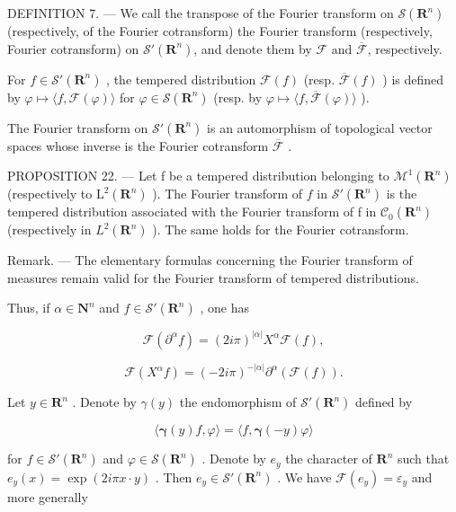 DEFINITION 7. --- We call the transpose of the Fourier transform on \(\mathcal{S}(\mathbf{R}^n)\) (respectively, of the Fourier cotransform) the Fourier transform (respectively, Fourier cotransform) on \(\mathcal{S}'(\mathbf{R}^n)\), and denote them by \(\mathcal{F}\) and \(\overline{\mathcal{F}}\), respectively.

For \(f \in \mathcal{S}'(\mathbf{R}^n)\) , the tempered distribution \(\mathcal{F}(f)\) (resp. \(\overline{\mathcal{F}}(f)\) ) is defined by \(\varphi \mapsto \langle f, \mathcal{F}(\varphi) \rangle\) for \(\varphi \in \mathcal{S}(\mathbf{R}^n)\) (resp. by \(\varphi \mapsto \langle f, \overline{\mathcal{F}}(\varphi) \rangle\) ).

The Fourier transform on \(\mathcal{S}'(\mathbf{R}^n)\) is an automorphism of topological vector spaces whose inverse is the Fourier cotransform \(\overline{\mathcal{F}}\) .

PROPOSITION 22. --- Let f be a tempered distribution belonging to \(\mathcal{M}^{1}(\mathbf{R}^{n})\) (respectively to \(\mathrm{L}^{2}(\mathbf{R}^{n})\) ). The Fourier transform of \(f\) in \(\mathcal{S}'(\mathbf{R}^{n})\) is the tempered distribution associated with the Fourier transform of f in \(\mathcal{C}_{0}(\mathbf{R}^{n})\) (respectively in \(L^{2}(\mathbf{R}^{n})\) ). The same holds for the Fourier cotransform.

Remark. --- The elementary formulas concerning the Fourier transform of measures remain valid for the Fourier transform of tempered distributions.

Thus, if \(\alpha \in \mathbf{N}^n\) and \(f\in \mathcal{S}'(\mathbf{R}^n)\) , one has

\[
\mathcal {F} (\partial^ {\alpha} f) = (2 i \pi) ^ {| \alpha |} X ^ {\alpha} \mathcal {F} (f),
\]

\[
\mathcal {F} (X ^ {\alpha} f) = (- 2 i \pi) ^ {- | \alpha |} \partial^ {\alpha} (\mathcal {F} (f)).
\]

Let \(y \in \mathbf{R}^n\) . Denote by \(\gamma(y)\) the endomorphism of \(\mathcal{S}'(\mathbf{R}^n)\) defined by

\[
\langle \boldsymbol {\gamma} (y) f, \varphi \rangle = \langle f, \boldsymbol {\gamma} (- y) \varphi \rangle
\]

for \(f \in \mathcal{S}'(\mathbf{R}^n)\) and \(\varphi \in \mathcal{S}(\mathbf{R}^n)\) . Denote by \(e_y\) the character of \(\mathbf{R}^n\) such that \(e_y(x) = \exp(2i\pi x \cdot y)\) . Then \(e_y \in \mathcal{S}'(\mathbf{R}^n)\) . We have \(\mathcal{F}(e_y) = \varepsilon_y\) and more generally

